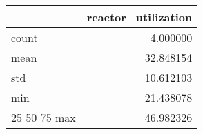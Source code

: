 \begin{tabular}{lr}
\toprule
 & reactor\_utilization \\
\midrule
count & 4.000000 \\
mean & 32.848154 \\
std & 10.612103 \\
min & 21.438078 \\
25%
50%
75%
max & 46.982326 \\
\bottomrule
\end{tabular}

